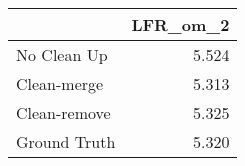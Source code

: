 \begin{tabular}{lr}
\toprule
{} & LFR_om_2 \\
\midrule
No Clean Up  &    5.524 \\
Clean-merge  &    5.313 \\
Clean-remove &    5.325 \\
Ground Truth &    5.320 \\
\bottomrule
\end{tabular}
